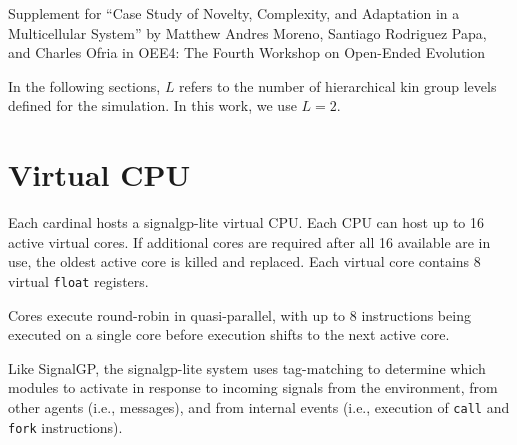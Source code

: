 \clearpage
\onecolumn

\vspace*{\fill}
{\Huge
Supplement for ``Case Study of Novelty, Complexity, and Adaptation in a Multicellular System'' by Matthew Andres Moreno, Santiago Rodriguez Papa, and Charles Ofria
in OEE4: The Fourth Workshop on Open-Ended Evolution}
\vspace*{\fill}

\clearpage

\setcounter{secnumdepth}{2}



\clearpage
\twocolumn






% 


In the following sections, $L$ refers to the number of hierarchical kin group levels defined for the simulation.
In this work, we use $L=2$.

\section{Virtual CPU} \label{sec:virtual_cpu}

Each cardinal hosts a signalgp-lite virtual CPU.
Each CPU can host up to 16 active virtual cores.
If additional cores are required after all 16 available are in use, the oldest active core is killed and replaced.
Each virtual core contains 8 virtual \texttt{float} registers.

Cores execute round-robin in quasi-parallel, with up to 8 instructions being executed on a single core before execution shifts to the next active core.

Like SignalGP, the signalgp-lite system uses tag-matching to determine which modules to activate in response to incoming signals from the environment, from other agents (i.e., messages), and from internal events (i.e., execution of \texttt{call} and \texttt{fork} instructions).


